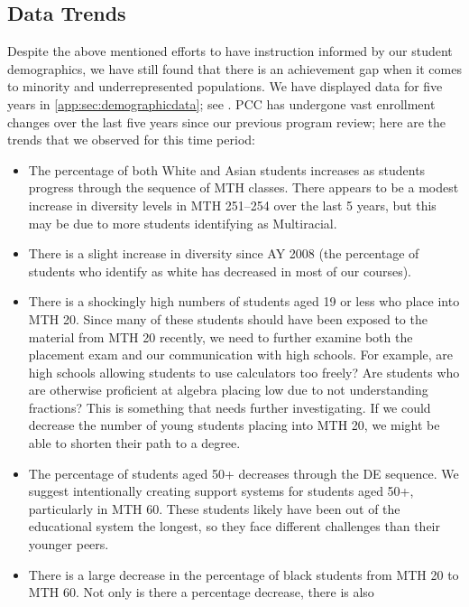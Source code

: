 \subsection{Data Trends}\label{needs:sec:trends}
Despite the above mentioned efforts to have instruction informed by our student
demographics, we have still found that there is an achievement gap when it
comes to minority and underrepresented populations. We have displayed data for
five years in \vref{app:sec:demographicdata}; see
. PCC has
undergone vast enrollment changes over the last five years since our previous
program review; here are the trends that we observed for this time period:
\begin{itemize}
    \item The percentage of both White and Asian students increases as students
      progress through the sequence of MTH classes. There appears to be a
      modest increase in diversity levels in MTH 251--254 over the last 5
      years, but this may be due to more students identifying as Multiracial.
    \item There is a slight increase in diversity since AY 2008 (the percentage
      of students who identify as white has decreased in most of our courses).  
    \item There is a shockingly high numbers of students aged 19 or less who
      place into MTH 20. Since many of these students should have been exposed
      to the material from MTH 20 recently, we need to further examine both the placement
      exam and our communication with high schools. For example, are high
      schools allowing students to use calculators too freely? Are students who
      are otherwise proficient at algebra placing low due to not understanding
      fractions? This is something that needs further investigating. If we
      could decrease the number of young students placing into MTH 20, we might
      be able to shorten their path to a degree.
    \item The percentage of students aged 50+ decreases through the DE
      sequence. We suggest intentionally creating support systems for students 
      aged 50+, particularly in MTH 60. These students likely have been out of
      the educational system the longest, so they face different challenges
      than their younger peers.
    \item There is a large decrease in the percentage of black students from
      MTH 20 to MTH 60. Not only is there a percentage decrease, there is also

\end{itemize}
